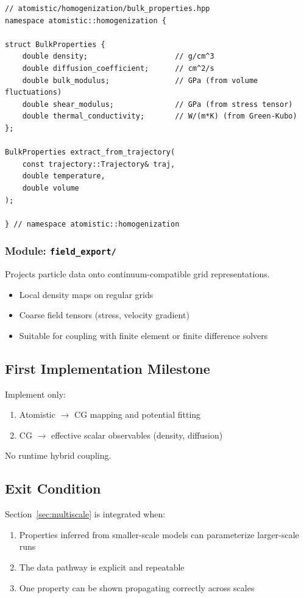 \documentclass[11pt]{article}
\begin{document}
\begin{lstlisting}
// atomistic/homogenization/bulk_properties.hpp
namespace atomistic::homogenization {

struct BulkProperties {
    double density;                    // g/cm^3
    double diffusion_coefficient;      // cm^2/s
    double bulk_modulus;               // GPa (from volume fluctuations)
    double shear_modulus;              // GPa (from stress tensor)
    double thermal_conductivity;       // W/(m*K) (from Green-Kubo)
};

BulkProperties extract_from_trajectory(
    const trajectory::Trajectory& traj,
    double temperature,
    double volume
);

} // namespace atomistic::homogenization
\end{lstlisting}

\subsubsection{Module: \texttt{field\_export/}}

Projects particle data onto continuum-compatible grid representations.

\begin{itemize}
  \item Local density maps on regular grids
  \item Coarse field tensors (stress, velocity gradient)
  \item Suitable for coupling with finite element or finite difference solvers
\end{itemize}

\subsection{First Implementation Milestone}

Implement only:
\begin{enumerate}
  \item Atomistic $\to$ CG mapping and potential fitting
  \item CG $\to$ effective scalar observables (density, diffusion)
\end{enumerate}

No runtime hybrid coupling.

\subsection{Exit Condition}

Section~\ref{sec:multiscale} is integrated when:
\begin{enumerate}
  \item Properties inferred from smaller-scale models can parameterize
        larger-scale runs
  \item The data pathway is explicit and repeatable
  \item One property can be shown propagating correctly across scales
\end{enumerate}
\end{document}
